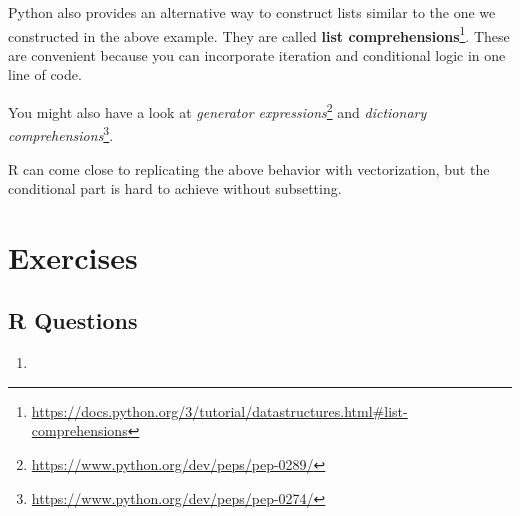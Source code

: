 \documentclass[12pt,krantz2]{krantz}
\makeatletter
\newenvironment{Shaded}{\begin{snugshade}}{\end{snugshade}}
\newcommand{\BuiltInTok}[1]{#1}
\newcommand{\CommentTok}[1]{\textcolor[rgb]{0.37,0.37,0.37}{\textit{#1}}}
\newcommand{\ControlFlowTok}[1]{\textcolor[rgb]{0.27,0.27,0.27}{\textbf{#1}}}
\newcommand{\DecValTok}[1]{\textcolor[rgb]{0.06,0.06,0.06}{#1}}
\newcommand{\KeywordTok}[1]{\textcolor[rgb]{0.27,0.27,0.27}{\textbf{#1}}}
\newcommand{\NormalTok}[1]{#1}
\newcommand{\OperatorTok}[1]{\textcolor[rgb]{0.43,0.43,0.43}{\textbf{#1}}}
\newcommand{\StringTok}[1]{\textcolor[rgb]{0.5,0.5,0.5}{#1}}
\renewcommand{\href}[2]{#2\footnote{\url{#1}}}
\newenvironment{kframe}{%
\medskip{}
\setlength{\fboxsep}{.8em}
 \def\at@end@of@kframe{}%
 \ifinner\ifhmode%
  \def\at@end@of@kframe{\end{minipage}}%
  \begin{minipage}{\columnwidth}%
 \fi\fi%
 \def\FrameCommand##1{\hskip\@totalleftmargin \hskip-\fboxsep
 \colorbox{shadecolor}{##1}\hskip-\fboxsep
     \hskip-\linewidth \hskip-\@totalleftmargin \hskip\columnwidth}%
 \MakeFramed {\advance\hsize-\width
   \@totalleftmargin\z@ \linewidth\hsize
   \@setminipage}}%
 {\par\unskip\endMakeFramed%
 \at@end@of@kframe}
\renewenvironment{Shaded}{\begin{kframe}}{\end{kframe}}
\makeatother
\begin{document}
Python also provides an alternative way to construct lists similar to the one we constructed in the above example. They are called \href{https://docs.python.org/3/tutorial/datastructures.html\#list-comprehensions}{\textbf{list comprehensions}}. These are convenient because you can incorporate iteration and conditional logic in one line of code.

\begin{Shaded}
\end{Shaded}

You might also have a look at \href{https://www.python.org/dev/peps/pep-0289/}{\emph{generator expressions}} and \href{https://www.python.org/dev/peps/pep-0274/}{\emph{dictionary comprehensions}}.

R can come close to replicating the above behavior with vectorization, but the conditional part is hard to achieve without subsetting.

\begin{Shaded}
\end{Shaded}

\hypertarget{exercises-9}{%
\section{Exercises}\label{exercises-9}}

\hypertarget{r-questions-8}{%
\subsection{R Questions}\label{r-questions-8}}

\begin{enumerate}
\def\labelenumi{\arabic{enumi}.}
\item
\end{enumerate}
\end{document}
